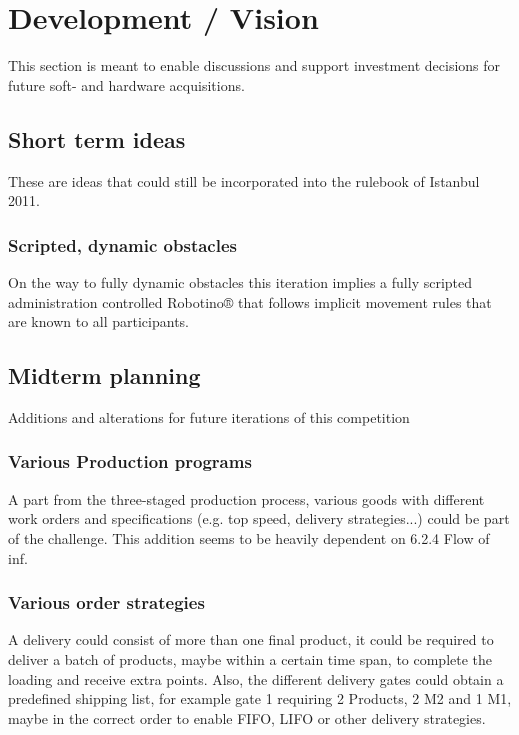 \documentclass[12pt,twoside]{article}
\begin{document}
\section{Development / Vision}

This section is meant to enable discussions and support investment
decisions for future soft- and hardware acquisitions.

\subsection{Short term ideas}

These are ideas that could still be incorporated into the rulebook of
Istanbul 2011. 

\subsubsection{Scripted, dynamic obstacles}

On the way to fully dynamic obstacles this iteration implies a fully scripted administration controlled Robotino® that follows implicit movement rules that are known to all participants.

\subsection{Midterm planning}

Additions and alterations for future iterations of this competition


\subsubsection{Various Production programs}

A part from the three-staged production process, various goods with
different work orders and specifications (e.g. top speed, delivery
strategies...) could be part of the challenge. This addition seems to
be heavily dependent on 6.2.4 Flow of inf.

\subsubsection{Various order strategies}

A delivery could consist of more than one final product, it could be required to deliver a batch of products, maybe within a certain time span, to complete the loading and receive extra points. Also, the different delivery gates could obtain a predefined shipping list, for example gate 1 requiring 2 Products, 2 M2 and 1 M1, maybe in the correct order to enable FIFO, LIFO or other delivery strategies.
\end{document}
